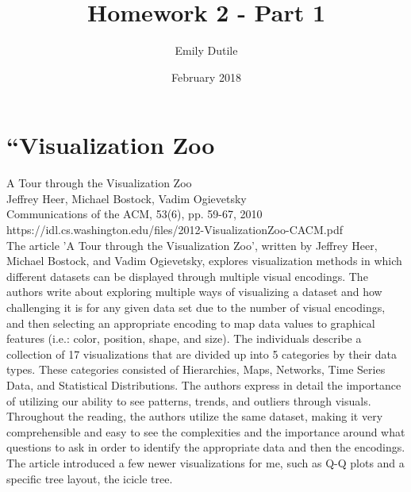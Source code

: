 \documentclass{neu_handout}
\title{Homework 2 - Part 1}
\author{Emily Dutile}
\date{February 2018}
\begin{document}
\section*{“Visualization Zoo}

A Tour through the Visualization Zoo\\
Jeffrey Heer, Michael Bostock, Vadim Ogievetsky\\
Communications of the ACM, 53(6), pp. 59-67, 2010\\
https://idl.cs.washington.edu/files/2012-VisualizationZoo-CACM.pdf\\

The article 'A Tour through the Visualization Zoo', written by Jeffrey Heer, Michael Bostock, and Vadim Ogievetsky, explores visualization methods in which different datasets can be displayed through multiple visual encodings. The authors write about exploring multiple ways of visualizing a dataset and how challenging it is for any given data set due to the number of visual encodings, and then selecting an appropriate encoding to map data values to graphical features (i.e.: color, position, shape, and size). The individuals describe a collection of 17 visualizations that are divided up into 5 categories by their data types. These categories consisted of Hierarchies, Maps, Networks, Time Series Data, and Statistical Distributions. The authors express in detail the importance of utilizing our ability to see patterns, trends, and outliers through visuals. Throughout the reading, the authors utilize the same dataset, making it very comprehensible and easy to see the complexities and the importance around what questions to ask in order to identify the appropriate data and then the encodings. The article introduced a few newer visualizations for me, such as Q-Q plots and a specific tree layout, the icicle tree.
\end{document}
